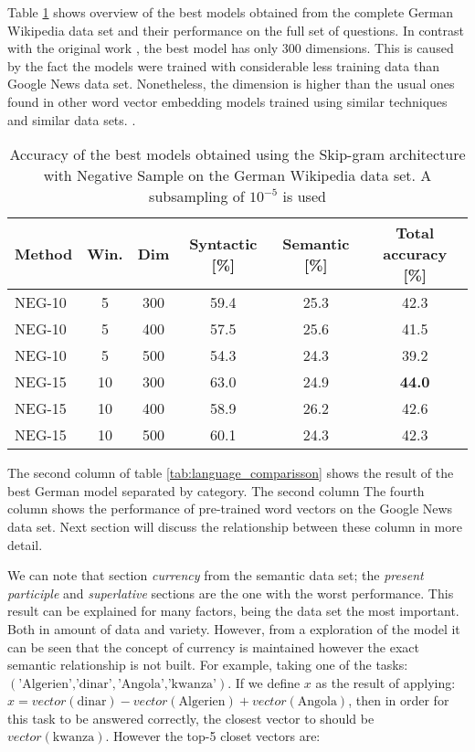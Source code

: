 Table \ref{tab:main_results} shows  overview of the best models obtained from
the complete German Wikipedia data set  and their performance on the full set
of questions. In contrast with the original work
\cite{MikolovSCCD13} \cite{DBLP:journals/corr/abs-1301-3781}, the best model
has only 300 dimensions. This is caused by the fact the models were trained
with considerable less training data than Google News data set. Nonetheless,
the dimension is higher than the usual ones found in other word vector embedding models
trained using similar techniques and similar data sets.\cite{Turian:2010:WRS:1858681.1858721} \cite{DBLP:journals/corr/abs-1103-0398}.

\begin{table}[h]
\centering

\caption{Accuracy of the best models obtained using the Skip-gram
  architecture with Negative Sample on the German Wikipedia data set. A
  subsampling of $10^{-5}$ is used} 
\label{tab:main_results}




\small
\begin{tabular}{|l|c|c|cc|c|}
\hline
Method  &  Win.  &  Dim   &  Syntactic [\%] & Semantic
[\%] &  Total accuracy [\%]  \\
\hline

NEG-10  &   5  &  300  &  59.4  &  25.3  &  42.3  \\
 NEG-10  &   5  &  400  &  57.5  &  25.6  &  41.5  \\
 NEG-10  &   5  &  500  &  54.3  &  24.3  &  39.2  \\
 NEG-15  &  10  &  300  &  63.0  &  24.9  &  \textbf{44.0}  \\
 NEG-15  &  10  &  400  &  58.9  &  26.2  &  42.6  \\
 NEG-15  &  10  &  500  &  60.1  &  24.3  &  42.3  \\
\hline
\end{tabular}
\end{table}

The second column of table \ref{tab:language_comparisson} shows the result of
the best German model separated by category. The second column The fourth column
shows the performance of pre-trained word vectors on the Google News data
set. Next section will discuss the relationship between these column in more detail.

We can note that section  \textit{currency} from
the semantic data set; the \textit{present participle}  and 
\textit{superlative}  sections are the one with the  worst performance. This
result can be explained for many factors, being the data set the most
important. Both in amount of data and variety. However, from a exploration of
the model it can be seen that the concept of currency is maintained however
the exact semantic relationship is not built.  For example, taking one of the
tasks:  $(\text{'Algerien','dinar'},\text{'Angola','kwanza'})$. If we define
$x$ as the result of applying:  $x = vector(\text{dinar}) -
vector(\text{Algerien}) + vector(\text{Angola})$, then in order for this task
to be answered correctly, the closest vector to should be $vector(\text{kwanza})$.
However the top-5 closet vectors are:


